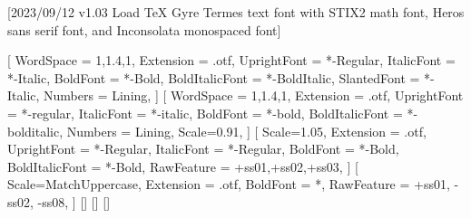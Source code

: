 
[2023/09/12 v1.03 Load TeX Gyre Termes text font with STIX2 math
font, Heros sans serif font, and Inconsolata monospaced font]

%
%
\ifpdftex
{}
\RequirePackage[T1]{fontenc}
\RequirePackage{bm}
\else
{}
%
\RequirePackage[warnings-off={mathtools-colon,mathtools-overbracket}]{unicode-math}
%
\setmainfont{TeXGyreTermesX}[%
  WordSpace = {1,1.4,1},%
  Extension = .otf,
  UprightFont = *-Regular,
  ItalicFont = *-Italic,
  BoldFont = *-Bold,
  BoldItalicFont = *-BoldItalic,
  SlantedFont = *-Italic,
  Numbers = Lining,
]
\setsansfont{texgyreheros}[%
  WordSpace = {1,1.4,1},
  Extension = .otf,
  UprightFont = *-regular,
  ItalicFont = *-italic,
  BoldFont = *-bold,
  BoldItalicFont = *-bolditalic,
  Numbers = Lining,
  Scale=0.91,%
]
\setmonofont{Inconsolatazi4}[%
  Scale=1.05,%
  Extension = .otf,
  UprightFont = *-Regular,
  ItalicFont = *-Regular,%
  BoldFont = *-Bold,
  BoldItalicFont = *-Bold,%
  RawFeature = {+ss01,+ss02,+ss03},
]
[%
  Scale=MatchUppercase,
  Extension = .otf,
  BoldFont = *,%
  RawFeature = {+ss01, -ss02, -ss08},
]
%
\setmathfontface{}[]%
\setmathfontface{}[]
\setmathfontface{}[]%
%
\newcommand*{\FRAC}[1]{{\addfontfeature{Fractions=On}#1}}%
\fi
